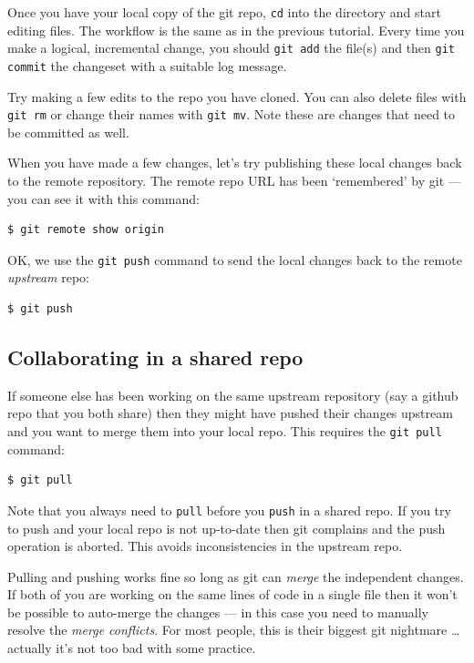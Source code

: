 \documentclass{article}
\begin{document}
Once you have your local copy of the git repo, \texttt{cd} into the directory and start editing files. The workflow is the same as in the previous tutorial.
Every time you make a logical, incremental change, you should \texttt{git add} the file(s) and then \texttt{git commit} the changeset with a suitable log message.

Try making a few edits to the repo you have cloned. You can also delete files with \texttt{git rm} or change their names with \texttt{git mv}. Note these are changes that need to be committed as well.

When you have made a few changes, let's try publishing these local changes back to the remote repository. The remote repo URL has been `remembered' by git --- you can see it with this command:

\begin{lstlisting}[style=BashInputStyle]
    $ git remote show origin
\end{lstlisting}

OK, we use the \texttt{git push} command to send the local changes back to the remote \emph{upstream} repo:

\begin{lstlisting}[style=BashInputStyle]
    $ git push
\end{lstlisting}


\subsection*{Collaborating in a shared repo}

If someone else has been working on the same upstream repository (say
a github repo that you both share) then they might have pushed their changes
upstream and you want to merge them into your local repo. This requires
the \texttt{git pull} command:

\begin{lstlisting}[style=BashInputStyle]
    $ git pull
\end{lstlisting}

Note that you always need to \texttt{pull} before you \texttt{push} in a shared repo. If you try to push and your local repo is not up-to-date then git complains
and the push operation is aborted. This avoids inconsistencies in
the upstream repo.

Pulling and pushing works fine so long as git can \emph{merge} the independent changes. If both of you are working on the same lines of code in a single file then it won't be possible to auto-merge the changes --- in this case you need to manually resolve the \emph{merge conflicts}. For most people, this is their biggest git nightmare \ldots actually it's not too bad with some practice.
\end{document}
